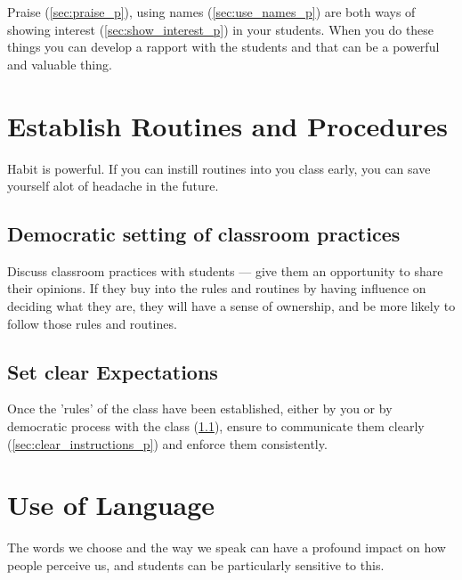 \documentclass[12pt]{report}
\begin{document}
Praise (\ref{sec:praise_p}), using names (\ref{sec:use_names_p}) are both ways of showing interest (\ref{sec:show_interest_p}) in your students. When you do these things you can develop a rapport with the students and that can be a powerful and valuable thing.



\section{Establish Routines and Procedures}
\label{sec:routines_p}

Habit is powerful. If you can instill routines into you class early, you can save yourself alot of headache in the future.

\subsection{Democratic setting of classroom practices}
\label{sec:democratic_setting_of_routines_p}

Discuss classroom practices with students --- give them an opportunity to share their opinions. If they buy into the rules and routines by having influence on deciding what they are, they will have a sense of ownership, and be more likely to follow those rules and routines.

\subsection{Set clear Expectations}
\label{sec:set_clear_expectations_p}

Once the 'rules' of the class have been established, either by you or by democratic process with the class (\ref{sec:democratic_setting_of_routines_p}), ensure to communicate them clearly (\ref{sec:clear_instructions_p}) and enforce them consistently.



\section{Use of Language}
\label{sec:language_p}

The words we choose and the way we speak can have a profound impact on how people perceive us, and students can be particularly sensitive to this.
\end{document}
